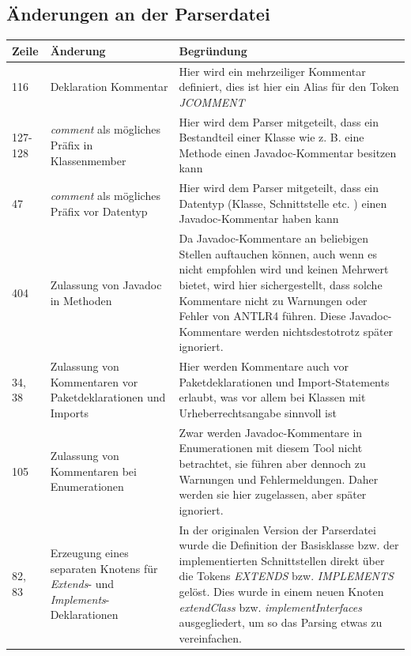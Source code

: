 
\renewcommand\appendixpagename{Anhänge}
\begin{appendices}


\chapter{Änderungen an der Parserdatei}

\begin{table}[h!]
    \centering
    \begin{tabular}{m{0.75cm}|m{4cm}|m{10cm}}
        \textbf{Zeile} & \textbf{Änderung} & \textbf{Begründung} \\
         \hline
        116 & Deklaration Kommentar & Hier wird ein mehrzeiliger Kommentar definiert, dies ist hier ein Alias für den Token \textit{JCOMMENT}\\
        \hline
        127-128 & \textit{comment} als mögliches Präfix in Klassenmember & Hier wird dem Parser mitgeteilt, dass ein Bestandteil einer Klasse wie z. B. eine Methode einen Javadoc-Kommentar besitzen kann\\
        \hline
        47 & \textit{comment} als mögliches Präfix vor Datentyp & Hier wird dem Parser mitgeteilt, dass ein Datentyp (Klasse, Schnittstelle etc. ) einen Javadoc-Kommentar haben kann \\
        \hline
        404 & Zulassung von Javadoc in Methoden & Da Javadoc-Kommentare an beliebigen Stellen auftauchen können, auch wenn es nicht empfohlen wird und keinen Mehrwert bietet, wird hier sichergestellt, dass solche Kommentare nicht zu Warnungen oder Fehler von ANTLR4 führen. Diese Javadoc-Kommentare werden nichtsdestotrotz später ignoriert.\\
        \hline
        34, 38& Zulassung von Kommentaren vor Paketdeklarationen und Imports & Hier werden Kommentare auch vor Paketdeklarationen und Import-Statements erlaubt, was vor allem bei Klassen mit Urheberrechtsangabe sinnvoll ist\\
        \hline
        105 & Zulassung von Kommentaren bei Enumerationen & Zwar werden Javadoc-Kommentare in Enumerationen mit diesem Tool nicht betrachtet, sie führen aber dennoch zu Warnungen und Fehlermeldungen. Daher werden sie hier zugelassen, aber später ignoriert. \\
        \hline
        82, 83 & Erzeugung eines separaten Knotens für \textit{Extends}- und \textit{Implements}-Deklarationen & In der originalen Version der Parserdatei wurde die Definition der Basisklasse bzw. der implementierten Schnittstellen direkt über die Tokens \textit{EXTENDS} bzw. \textit{IMPLEMENTS} gelöst. Dies wurde in einem neuen Knoten \textit{extendClass} bzw. \textit{implementInterfaces} ausgegliedert, um so das Parsing etwas zu vereinfachen.  \\
         

\end{tabular}
\end{table}
\end{appendices}
